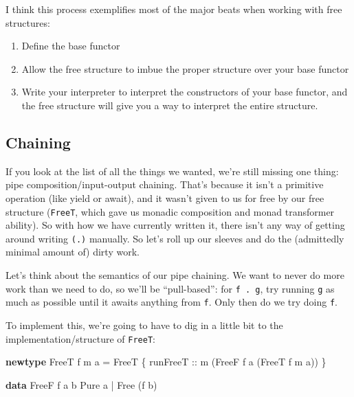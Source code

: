 \documentclass[]{article}
\newenvironment{Shaded}{}{}
\newcommand{\DataTypeTok}[1]{\textcolor[rgb]{0.56,0.13,0.00}{#1}}
\newcommand{\KeywordTok}[1]{\textcolor[rgb]{0.00,0.44,0.13}{\textbf{#1}}}
\newcommand{\NormalTok}[1]{#1}
\newcommand{\OperatorTok}[1]{\textcolor[rgb]{0.40,0.40,0.40}{#1}}
\newcommand{\OtherTok}[1]{\textcolor[rgb]{0.00,0.44,0.13}{#1}}
\begin{document}
I think this process exemplifies most of the major beats when working with free
structures:

\begin{enumerate}
\def\labelenumi{\arabic{enumi}.}
\tightlist
\item
  Define the base functor
\item
  Allow the free structure to imbue the proper structure over your base functor
\item
  Write your interpreter to interpret the constructors of your base functor, and
  the free structure will give you a way to interpret the entire structure.
\end{enumerate}

\hypertarget{chaining}{%
\subsection{Chaining}\label{chaining}}

If you look at the list of all the things we wanted, we're still missing one
thing: pipe composition/input-output chaining. That's because it isn't a
primitive operation (like yield or await), and it wasn't given to us for free by
our free structure (\texttt{FreeT}, which gave us monadic composition and monad
transformer ability). So with how we have currently written it, there isn't any
way of getting around writing \texttt{(.\textbar{})} manually. So let's roll up
our sleeves and do the (admittedly minimal amount of) dirty work.

Let's think about the semantics of our pipe chaining. We want to never do more
work than we need to do, so we'll be ``pull-based'': for
\texttt{f\ .\textbar{}\ g}, try running \texttt{g} as much as possible until it
awaits anything from \texttt{f}. Only then do we try doing \texttt{f}.

To implement this, we're going to have to dig in a little bit to the
implementation/structure of \texttt{FreeT}:

\begin{Shaded}
\begin{Highlighting}[]
\KeywordTok{newtype} \DataTypeTok{FreeT}\NormalTok{ f m a }\OtherTok{=} \DataTypeTok{FreeT}
\NormalTok{    \{}\OtherTok{ runFreeT ::}\NormalTok{ m (}\DataTypeTok{FreeF}\NormalTok{ f a (}\DataTypeTok{FreeT}\NormalTok{ f m a)) \}}

\KeywordTok{data} \DataTypeTok{FreeF}\NormalTok{ f a b}
      \DataTypeTok{Pure}\NormalTok{ a}
    \OperatorTok{|} \DataTypeTok{Free}\NormalTok{ (f b)}
\end{Highlighting}
\end{Shaded}
\end{document}
